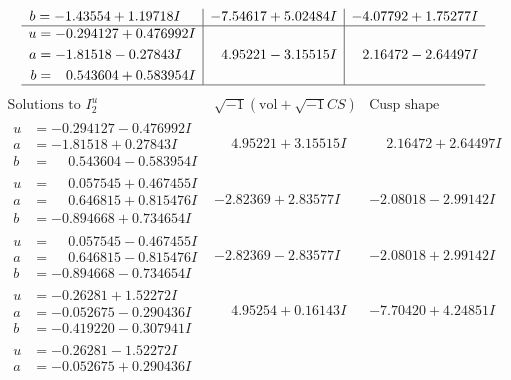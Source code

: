 \documentclass[1p]{elsarticle_modified}
\theoremstyle{definition}
\newcommand{\I}{\sqrt{-1}}
\begin{document}
$$\begin{array}{c|c|c}
\begin{aligned}
b &= -1.43554 + 1.19718 I\end{aligned}
 & -7.54617 + 5.02484 I & -4.07792 + 1.75277 I \\ \hline\begin{aligned}
u &= -0.294127 + 0.476992 I \\
a &= -1.81518 - 0.27843 I \\
b &= \phantom{-}0.543604 + 0.583954 I\end{aligned}
 & \phantom{-}4.95221 - 3.15515 I & \phantom{-}2.16472 - 2.64497 I\\
 \hline 
 \end{array}$$\newpage$$\begin{array}{c|c|c}  
\text{Solutions to }I^u_{2}& \I (\text{vol} + \sqrt{-1}CS) & \text{Cusp shape}\\
 \hline 
\begin{aligned}
u &= -0.294127 - 0.476992 I \\
a &= -1.81518 + 0.27843 I \\
b &= \phantom{-}0.543604 - 0.583954 I\end{aligned}
 & \phantom{-}4.95221 + 3.15515 I & \phantom{-}2.16472 + 2.64497 I \\ \hline\begin{aligned}
u &= \phantom{-}0.057545 + 0.467455 I \\
a &= \phantom{-}0.646815 + 0.815476 I \\
b &= -0.894668 + 0.734654 I\end{aligned}
 & -2.82369 + 2.83577 I & -2.08018 - 2.99142 I \\ \hline\begin{aligned}
u &= \phantom{-}0.057545 - 0.467455 I \\
a &= \phantom{-}0.646815 - 0.815476 I \\
b &= -0.894668 - 0.734654 I\end{aligned}
 & -2.82369 - 2.83577 I & -2.08018 + 2.99142 I \\ \hline\begin{aligned}
u &= -0.26281 + 1.52272 I \\
a &= -0.052675 - 0.290436 I \\
b &= -0.419220 - 0.307941 I\end{aligned}
 & \phantom{-}4.95254 + 0.16143 I & -7.70420 + 4.24851 I \\ \hline\begin{aligned}
u &= -0.26281 - 1.52272 I \\
a &= -0.052675 + 0.290436 I \\

\end{aligned}
\end{array}$$
\end{document}
